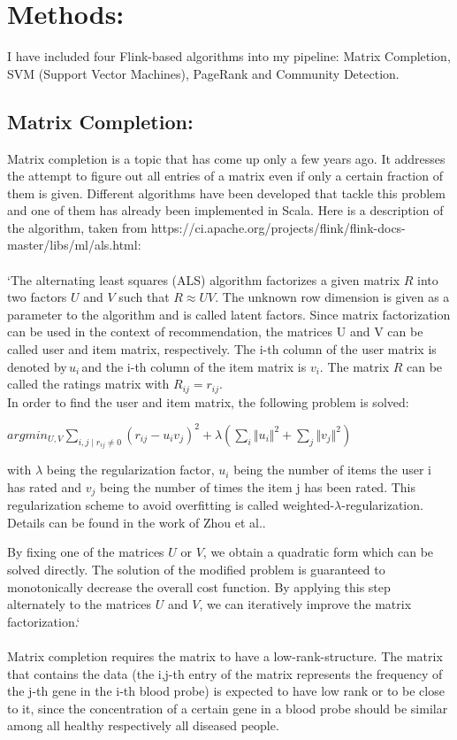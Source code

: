 \documentclass{bioinfo}
\begin{document}
 

\section{Methods:}
 

I have included four Flink-based algorithms into my pipeline: Matrix Completion, SVM (Support Vector Machines), PageRank and Community Detection.

 

\subsection{Matrix Completion: }
\label{matrixcompletion_algo}

  

Matrix completion is a topic that has come up only a few years ago. It addresses the attempt to figure out all entries of a matrix even if only a certain fraction of them is given. Different algorithms have been developed that tackle this problem and one of them has already been implemented in Scala. Here is a description of the algorithm, taken from https://ci.apache.org/projects/flink/flink-docs-master/libs/ml/als.html: \\\\
`The alternating least squares (ALS) algorithm factorizes a given matrix $R$ into two factors $U$ and $V$ such that $R\approx UV$. The unknown row dimension is given as a parameter to the algorithm and is called latent factors. Since matrix factorization can be used in the context of recommendation, the matrices U and V can be called user and item matrix, respectively. The i-th column of the user matrix is denoted by $u_i$ and the i-th column of the item matrix is $v_i$. The matrix $R$ can be called the ratings matrix with $R_{ij} =r_{ij}$.\\
In order to find the user and item matrix, the following problem is solved: 

$ argmin_{U,V} \sum_{i,j\mid r_{ij} \neq0}(r_{ij}−u_i v_j)^{2}+\lambda(\sum_i \Vert u_i\Vert ^{2}+\sum_j \Vert v_j \Vert ^{2}) $

with $\lambda$ being the regularization factor, $u_i$ being the number of items the user i has rated and $v_j$ being the number of times the item j has been rated. This regularization scheme to avoid overfitting is called weighted-$\lambda$-regularization. Details can be found in the work of Zhou et al.. 

By fixing one of the matrices $U$ or $V$, we obtain a quadratic form which can be solved directly. The solution of the modified problem is guaranteed to monotonically decrease the overall cost function. By applying this step alternately to the matrices $U$ and $V$, we can iteratively improve the matrix factorization.`\\\\
Matrix completion requires the matrix to have a low-rank-structure. The matrix that contains the data (the i,j-th entry of the matrix represents the frequency of the j-th gene in the i-th blood probe) is expected to have low rank or to be close to it, since the concentration of a certain gene in a blood probe should be similar among all healthy respectively all diseased people. 
\end{document}
